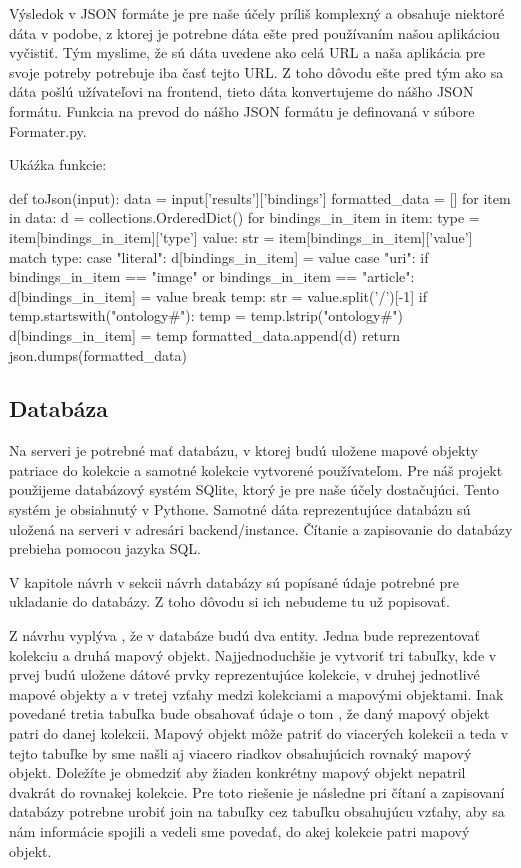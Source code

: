Výsledok v JSON formáte je pre naše účely príliš komplexný a obsahuje niektoré dáta v podobe, z ktorej je potrebne dáta ešte pred používaním našou aplikáciou vyčistiť. Tým myslime, že sú dáta 
uvedene ako celá URL a naša aplikácia pre svoje potreby potrebuje iba časť tejto URL. 
Z toho dôvodu ešte pred tým ako sa dáta pošlú užívateľovi na frontend, tieto dáta konvertujeme do nášho JSON formátu. Funkcia na prevod do nášho JSON formátu je definovaná v súbore Formater.py. 

Ukáźka funkcie:
\begin{code}
def toJson(input):
    data = input['results']['bindings']
    formatted_data = []
    for item in data:
        d = collections.OrderedDict()
        for bindings_in_item in item:
            type = item[bindings_in_item]['type']
            value: str = item[bindings_in_item]['value']
            match type:
                case "literal":
                    d[bindings_in_item] = value
                case "uri":
                    if bindings_in_item == "image" or
                    bindings_in_item == "article":
                        d[bindings_in_item] = value
                        break
                    temp: str = value.split('/')[-1]
                    if temp.startswith("ontology#"):
                        temp = temp.lstrip("ontology#")
                    d[bindings_in_item] = temp
        formatted_data.append(d)
    return json.dumps(formatted_data)
\end{code}

\subsection{Databáza}
Na serveri je potrebné mať databázu, v ktorej budú uložene mapové objekty patriace do kolekcie a samotné kolekcie vytvorené používateľom. 
Pre náš projekt použijeme databázový systém SQlite, ktorý je pre naše účely dostačujúci. Tento systém je obsiahnutý v Pythone. Samotné dáta reprezentujúce  databázu sú uložená na serveri v adresári backend/instance. Čítanie a zapisovanie do databázy prebieha pomocou jazyka SQL. 

V kapitole návrh v sekcii návrh databázy sú popísané údaje potrebné pre ukladanie do databázy. Z toho dôvodu si ich nebudeme tu už popisovať. 

Z návrhu vyplýva , že v databáze budú dva entity. Jedna bude reprezentovať kolekciu a druhá mapový objekt. Najjednoduchšie je vytvoriť tri tabuľky, kde 
v prvej budú uložene dátové prvky reprezentujúce kolekcie, v druhej jednotlivé mapové objekty a v tretej vzťahy medzi kolekciami a mapovými objektami. Inak povedané tretia tabuľka bude obsahovať údaje o tom , že daný mapový objekt 
patri do danej kolekcii. Mapový objekt môže patriť do viacerých kolekcii a teda v tejto tabuľke by sme našli aj viacero riadkov obsahujúcich rovnaký mapový objekt. Doležíte je obmedziť aby 
žiaden konkrétny mapový objekt nepatril dvakrát do rovnakej kolekcie. Pre toto riešenie je následne pri čítaní a zapisovaní databázy potrebne urobiť join na tabuľky cez tabuľku obsahujúcu vzťahy, aby sa nám informácie spojili a vedeli sme povedať, do akej kolekcie patri mapový objekt. 

